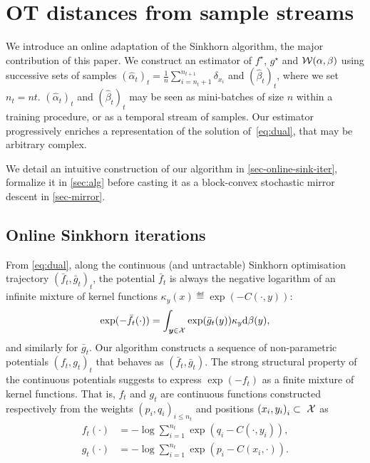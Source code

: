 
\section{OT distances from sample streams}

We introduce an online adaptation of the Sinkhorn algorithm, the major
contribution of this paper. We construct an estimator of $f^\star$, $g^\star$
and $\mathcal{W}(\alpha,\beta)$ using successive sets of samples ${(\hat \alpha_t)}_t =
\frac{1}{n} \sum_{i=n_t + 1}^{n_{t+1}} \delta_{x_i}$ and ${(\hat \beta_t)}_t$,
where we set $n_t = nt$. $(\hat \alpha_t)_t$ and $(\hat \beta_t)_t$ may be seen
as mini-batches of size $n$ within a training procedure, or as a temporal stream
of samples.
%
Our estimator progressively enriches a representation of the
solution of~\eqref{eq:dual}, that may be arbitrary complex. 

We detail an intuitive construction of our algorithm in
\autoref{sec-online-sink-iter}, formalize it in \autoref{sec:alg} before casting
it as a block-convex stochastic mirror descent in \ref{sec-mirror}.


\subsection{Online Sinkhorn iterations}
\label{sec-online-sink-iter}

From \eqref{eq:dual}, along the continuous (and untractable) Sinkhorn
optimisation trajectory ${(\bar f_t, \bar g_t)}_t$, the potential $\bar f_t$ is
always the negative logarithm of an infinite mixture of kernel functions
$\kappa_y(x) \eqdef \exp(-C(\cdot, y))$:
\begin{equation*}
    \exp(-\bar f_t(\cdot)) = 
    \int_{\bm{y} \in \mathcal{X}} \exp(\bar g_t(y))  \kappa_y  \textrm{d} \beta(y),
\end{equation*}
and similarly for $\bar g_t$. Our algorithm constructs a sequence of non-parametric
potentials $(f_t, g_t)_t$ that behaves as $(\bar f_t, \bar g_t)$. The strong
structural property of the continuous potentials suggests to express
$\exp(-f_t)$ as a finite mixture of kernel functions. That is, $f_t$ and $g_t$
are continuous functions constructed respectively from the weights ${(p_i,
q_i)}_{i \leq n_t}$ and positions ${(x_i, y_i)}_{i} \subset~\mathcal{X}$ as
\begin{align}\label{eq:param}
    f_t(\cdot) &= - \log \sum_{i=1}^{n_t} 
    \exp(q_i - C(\cdot, y_i)),  \\
    g_t(\cdot) &= - \log \sum_{i=1}^{n_t}
    \exp(p_i - C(x_i, \cdot)).
\end{align}
